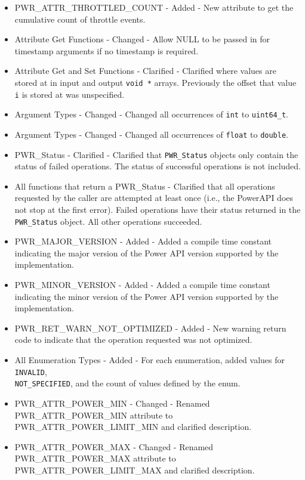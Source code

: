 \documentclass[12pt]{report} %
\begin{document}
\begin{appendices}
\begin{itemize}
    \item{PWR_ATTR_THROTTLED_COUNT - Added - New attribute to get the cumulative count of throttle events.}
    \item{Attribute Get Functions - Changed - Allow NULL to be passed in for timestamp arguments if no timestamp is required.}
    \item{Attribute Get and Set Functions - Clarified - Clarified where values are stored at in input and output \texttt{void *} arrays. Previously the offset that value \texttt{i} is stored at was unspecified.}
    \item{Argument Types - Changed - Changed all occurrences of \texttt{int} to \texttt{uint64_t}.}
    \item{Argument Types - Changed - Changed all occurrences of \texttt{float} to \texttt{double}.}
    \item{PWR_Status - Clarified - Clarified that \texttt{PWR_Status} objects only contain the status of failed operations. The status of successful operations is not included.}
    \item{All functions that return a PWR_Status - Clarified that all operations requested by the caller are attempted at least once (i.e., the PowerAPI does not stop at the first error). Failed operations have their status returned in the \texttt{PWR_Status} object. All other operations succeeded.}
    \item{PWR_MAJOR_VERSION - Added - Added a compile time constant indicating the major version of the Power API version supported by the implementation.}
    \item{PWR_MINOR_VERSION - Added - Added a compile time constant indicating the minor version of the Power API version supported by the implementation.}
    \item{PWR_RET_WARN_NOT_OPTIMIZED - Added - New warning return code to indicate that the operation requested was not optimized.}
    \item{All Enumeration Types - Added - For each enumeration, added values for \texttt{INVALID},\\
    \texttt{NOT_SPECIFIED}, and the count of values defined by the enum.}
    \item{PWR_ATTR_POWER_MIN - Changed - Renamed PWR_ATTR_POWER_MIN attribute to PWR_ATTR_POWER_LIMIT_MIN and clarified description.}
    \item{PWR_ATTR_POWER_MAX - Changed - Renamed PWR_ATTR_POWER_MAX attribute to PWR_ATTR_POWER_LIMIT_MAX and clarified description.}
\end{itemize}




\end{appendices}
\end{document}
